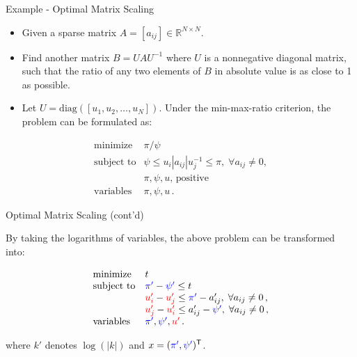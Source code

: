 \documentclass[
  ignorenonframetext,
  aspectratio=169,
  serif,onlymath]{beamer}
\begin{document}
\begin{frame}{Example - Optimal Matrix Scaling
\citep{orlin1985computing}}
\protect\hypertarget{example---optimal-matrix-scaling-orlin1985computing}{}

\begin{itemize}
\item
  Given a sparse matrix \(A = [a_{ij}] \in \mathbb{R}^{N\times N}\).
\item
  Find another matrix \(B = U A U^{-1}\) where \(U\) is a nonnegative
  diagonal matrix, such that the ratio of any two elements of \(B\) in
  absolute value is as close to 1 as possible.
\item
  Let \(U = \mathrm{diag}([u_1, u_2, \ldots, u_N])\). Under the
  min-max-ratio criterion, the problem can be formulated as:
\end{itemize}

\[\begin{array}{ll}
  \text{minimize}   &   \pi/\psi  \\
  \text{subject to} &   \psi \le u_i |a_{ij}| u_j^{-1} \le \pi, \; \forall a_{ij} \neq 0 , \\
                    &   \pi, \psi, u, \, \text{positive} \\
  \text{variables}  &   \pi, \psi, u \, .
  \end{array}\]

\end{frame}

\begin{frame}{Optimal Matrix Scaling (cont'd)}
\protect\hypertarget{optimal-matrix-scaling-contd}{}

By taking the logarithms of variables, the above problem can be
transformed into:

\[\begin{array}{ll}
  \text{minimize}   &   t \\
  \text{subject to} &   {\color{blue}\pi'} - {\color{blue}\psi'} \le t \\
                    &   {\color{red}u_i'} - {\color{red}u_j'}  \le {\color{blue}\pi'} - a_{ij}', \; \forall a_{ij} \neq 0 \,, \\
                    &   {\color{red}u_j'} - {\color{red}u_i'} \le a_{ij}' - {\color{blue}\psi'}, \; \forall a_{ij} \neq 0 \,, \\
  \text{variables}  &   {\color{blue}\pi'}, {\color{blue}\psi'}, {\color{red}u'} \, .
  \end{array}\]

where \(k'\) denotes \(\log( | k | )\) and
\(x = ({\color{blue}\pi'}, {\color{blue}\psi'} )^\mathsf{T}\).

\end{frame}
\end{document}

